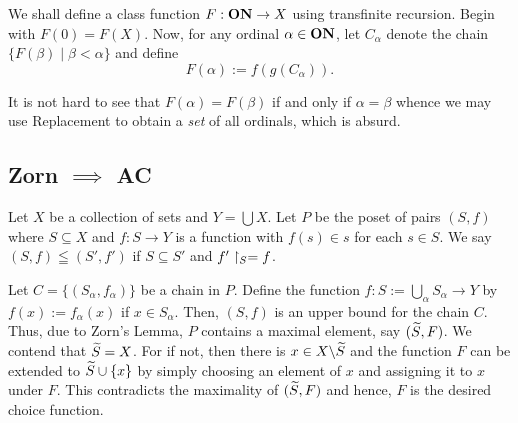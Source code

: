 We shall define a class function $F:\mathbf{ON}\to X$ using transfinite recursion. Begin with $F(0) = F(X)$. Now, for any ordinal $\alpha\in\mathbf{ON}$, let $C_\alpha$ denote the chain $\{F(\beta)\mid \beta < \alpha\}$ and define 
\begin{equation*}
    F(\alpha) := f(g(C_\alpha)).
\end{equation*}

It is not hard to see that $F(\alpha) = F(\beta)$ if and only if $\alpha = \beta$ whence we may use Replacement to obtain a \emph{set} of all ordinals, which is absurd.

\subsection*{Zorn \texorpdfstring{$\implies$}{} AC}

Let $X$ be a collection of sets and $Y = \bigcup X$. Let $P$ be the poset of pairs $(S, f)$ where $S\subseteq X$ and $f: S\to Y$ is a function with $f(s)\in s$ for each $s\in S$. We say $(S, f)\leqq(S',f')$ if $S\subseteq S'$ and $f'\upharpoonright_S = f$. 

Let $C = \{(S_\alpha, f_\alpha)\}$ be a chain in $P$. Define the function $f:S := \bigcup_{\alpha} S_\alpha\to Y$ by $f(x) := f_\alpha(x)$ if $x\in S_\alpha$. Then, $(S, f)$ is an upper bound for the chain $C$. Thus, due to Zorn's Lemma, $P$ contains a maximal element, say $(\widetilde{S}, F)$. We contend that $\widetilde{S} = X$. For if not, then there is $x\in X\backslash\widetilde{S}$ and the function $F$ can be extended to $\widetilde{S}\cup\{x\}$ by simply choosing an element of $x$ and assigning it to $x$ under $F$. This contradicts the maximality of $(\widetilde{S}, F)$ and hence, $F$ is the desired choice function.